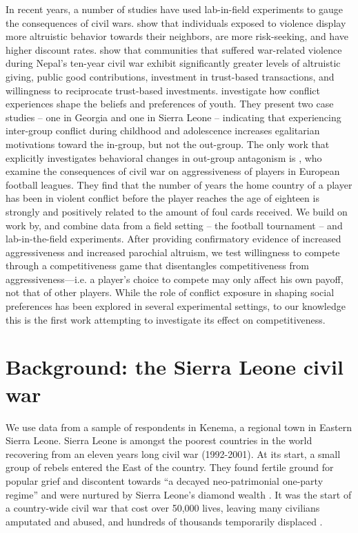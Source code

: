 In recent years, a number of studies have used lab-in-field experiments to gauge the consequences of civil wars. \cite{Voors2012} show that individuals exposed to violence display more altruistic behavior towards their neighbors, are more risk-seeking, and have higher discount rates. \cite{Gilligan2014} show that communities that suffered war-related violence during Nepal's ten-year civil war exhibit significantly greater levels of altruistic giving, public good contributions, investment in trust-based transactions, and willingness to reciprocate trust-based investments. \cite{Bauer2014} investigate how conflict experiences shape the beliefs and preferences of youth. They present two case studies – one in Georgia and one in Sierra Leone – indicating that experiencing inter-group conflict during childhood and adolescence increases egalitarian motivations toward the in-group, but not the out-group. The only work that explicitly investigates behavioral changes in out-group antagonism is \cite{Miguel2011b}, who examine the consequences of civil war on aggressiveness of players in European football leagues. They find that the number of years the home country of a player has been in violent conflict before the player reaches the age of eighteen is strongly and positively related to the amount of foul cards received. 
We build on work by\cite{Miguel2011b}, and combine data from a field setting – the football tournament – and lab-in-the-field experiments. After providing confirmatory evidence of increased aggressiveness and increased parochial altruism, we test willingness to compete through a competitiveness game that disentangles competitiveness from aggressiveness—i.e. a player’s choice to compete may only affect his own payoff, not that of other  players. While the role of conflict exposure in shaping social preferences has been explored in several experimental settings, to our knowledge this is the first work attempting to investigate its effect on competitiveness.

\section{Background: the Sierra Leone civil war}
\label{sec:slf:background}
We use data from a sample of respondents in Kenema, a regional town in Eastern Sierra Leone. Sierra Leone is amongst the poorest countries in the world recovering from an eleven years long civil war (1992-2001). At its start, a small group of rebels entered the East of the country. They found fertile ground for popular grief and discontent towards “a decayed neo-patrimonial one-party regime” \citep{Richards1999} and were nurtured by Sierra Leone’s diamond wealth \citep{Keen2005a}. It was the start of a country-wide civil war that cost over 50,000 lives, leaving many civilians amputated and abused, and hundreds of thousands temporarily displaced \citep{HumanRightsWatch1999a,Doucet2012a}.


